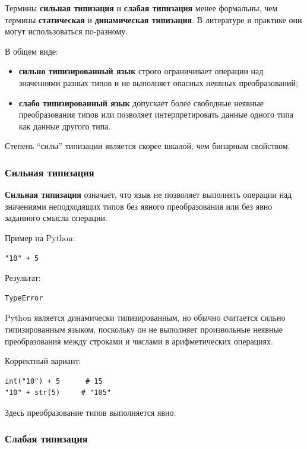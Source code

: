 \documentclass[12pt,a4paper]{article}
\begin{document}
Термины \textbf{сильная типизация} и \textbf{слабая типизация} менее формальны, чем
термины \textbf{статическая} и \textbf{динамическая типизация}. В литературе и практике
они могут использоваться по-разному.

В общем виде:

\begin{itemize}
    \item \textbf{сильно типизированный язык} строго ограничивает операции над
    значениями разных типов и не выполняет опасных неявных преобразований;
    \item \textbf{слабо типизированный язык} допускает более свободные неявные
    преобразования типов или позволяет интерпретировать данные одного типа как данные
    другого типа.
\end{itemize}

Степень ``силы'' типизации является скорее шкалой, чем бинарным свойством.

\subsubsection{Сильная типизация}

\textbf{Сильная типизация} означает, что язык не позволяет выполнять операции над
значениями неподходящих типов без явного преобразования или без явно заданного
смысла операции.

Пример на Python:

\begin{verbatim}
"10" + 5
\end{verbatim}

Результат:

\begin{verbatim}
TypeError
\end{verbatim}

Python является динамически типизированным, но обычно считается сильно
типизированным языком, поскольку он не выполняет произвольные неявные преобразования
между строками и числами в арифметических операциях.

Корректный вариант:

\begin{verbatim}
int("10") + 5      # 15
"10" + str(5)     # "105"
\end{verbatim}

Здесь преобразование типов выполняется явно.

\subsubsection{Слабая типизация}
\end{document}
